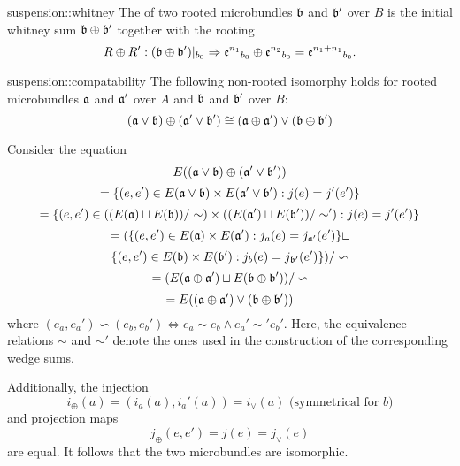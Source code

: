 \begin{mydefinition}{suspension::whitney}
    The  of two rooted microbundles $\bb$ and $\bb'$ over $B$
    is the initial whitney sum $\whitney{\bb}{\bb'}$ together with the rooting
    \[ \germdef{\whitney{R}{R'}}{(\whitney{\bb}{\bb'})\restr{b_0}}{\whitney{\be[n_1]{}_{b_0}}{\be[n_2]{}_{b_0}} = \be[n_1 + n_1]{}_{b_0}}. \]
\end{mydefinition}

\begin{mylemma}{suspension::compatability}   
    The following non-rooted isomorphy holds
    for rooted microbundles $\ba$ and $\ba'$ over $A$
    and $\bb$ and $\bb'$ over $B$: 
    \[
        \whitney{(\ba \vee \bb)}{(\ba' \vee \bb')}
        \cong (\whitney{\ba}{\ba'}) \vee (\whitney{\bb}{\bb'})
    \]
\end{mylemma}
\begin{myproof}
    Consider the equation
    \[ E(\whitney{(\ba \vee \bb)}{(\ba' \vee \bb')}) \]
    \[ = \set{(e, e') \in E(\ba \vee \bb) \times E(\ba' \vee \bb')}{j(e) = j'(e')} \]
    \[ = \set{(e, e') \in ((E(\ba) \sqcup E(\bb)) / \sim) \times ((E(\ba') \sqcup E(\bb')) / \sim')}{j(e) = j'(e')} \]
    \[ = (\set{(e, e') \in E(\ba) \times E(\ba')}{j_a(e) = j_{\ba'}(e')} \sqcup \]
    \[ \set{(e, e') \in E(\bb) \times E(\bb')}{j_b(e) = j_{\bb'}(e')}) / \backsim \]
    \[ = (E(\whitney{\ba}{\ba'}) \sqcup E(\whitney{\bb}{\bb'})) / \backsim \]
    \[ = E((\whitney{\ba}{\ba'}) \vee (\whitney{\bb}{\bb'})) \]
    where $(e_a, e_a') \backsim (e_b, e_b') \iff e_a \sim e_b \land e_a' \sim' e_b'$.
    Here, the equivalence relations $\sim$ and $\sim'$ denote the ones
    used in the construction of the corresponding wedge sums.

    Additionally, the injection
    \[ i_\oplus(a) = (i_a(a), i_a'(a)) = i_\vee(a) \text{ (symmetrical for $b$)}\]
    and projection maps
    \[ j_\oplus(e, e') = j(e) =  j_\vee(e) \]
    are equal.
    It follows that the two microbundles are isomorphic.
\end{myproof}
